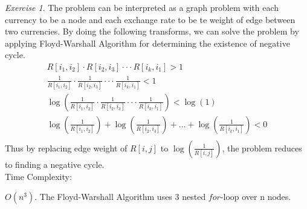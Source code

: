 \documentclass[a4paper,10pt,twoside]{article}
\theoremstyle{plain}
\theoremstyle{definition}
\theoremstyle{remark}
\newtheorem{exercise}{Exercise}
\begin{document}
\begin{exercise}
The problem can be interpreted as a graph problem with each currency to be a node and each exchange rate to be te weight of edge between two currencies. 
By doing the following transforms, we can solve the problem by applying Floyd-Warshall Algorithm for determining the existence of negative cycle.
 \[
 	\begin{aligned}
		R[i_1, i_2] \cdot R[i_2, i_3] \cdot \cdot \cdot R[i_k, i_1] > 1 \\
 		\frac{1}{R[i_1, i_2]} \cdot \frac{1}{R[i_2, i_3]} \cdot \cdot \cdot \frac{1}{R[i_k, i_1]} < 1 \\
		\log(\frac{1}{R[i_1, i_2]} \cdot \frac{1}{R[i_2, i_3]} \cdot \cdot \cdot \frac{1}{R[i_k, i_1]}) < \log(1) \\
		\log(\frac{1}{R[i_1, i_2]}) + \log(\frac{1}{R[i_2, i_3]}) + ... + \log(\frac{1}{R[i_k, i_1]}) < 0 \\
 	\end{aligned}
 \]
Thus by replacing edge weight of $R[i, j]$ to $\log(\frac{1}{R[i, j]})$, the problem reduces to finding a negative cycle.\\

Time Complexity:

$O(n^3)$. 
The Floyd-Warshall Algorithm uses 3 nested $for$-loop over n nodes.

\end{exercise}
\end{document}
